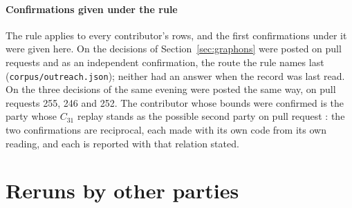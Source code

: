 \documentclass[preprint,11pt,authoryear,a4paper]{elsarticle}
\begin{document}
\paragraph{Confirmations given under the rule} The rule applies to every contributor's rows, and the first confirmations under it were given here. On \OcGnPosted{} the decisions of Section~\ref{sec:graphons} were posted on pull requests \OcGnPrB{} and \OcGnPrC{} as an independent confirmation, the route the rule names last (\texttt{corpus/outreach.json}); neither had an answer when the record was last read. On \OcLaterPosted{} the three decisions of the same evening were posted the same way, on pull requests 255, 246 and 252. The contributor whose bounds were confirmed is the party whose $C_{31}$ replay stands as the possible second party on pull request \OcLuOurPr: the two confirmations are reciprocal, each made with its own code from its own reading, and each is reported with that relation stated.

\section{Reruns by other parties}\label{sec:outside}
\end{document}

